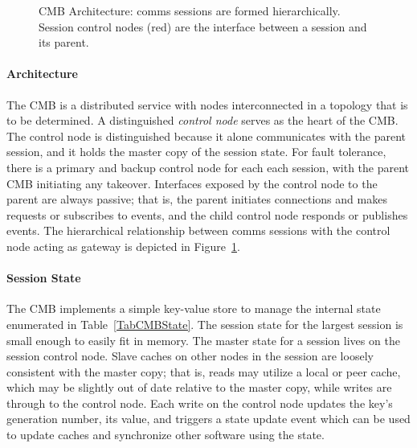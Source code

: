 \begin{figure}
\begin{minipage}[b]{0.2\linewidth}
\end{minipage}
\caption{CMB Architecture:  comms sessions are formed hierarchically.
Session control nodes (red) are the interface between a session and its parent.}
\label{FigCommsEx1}
\end{figure}

\paragraph{Architecture}
The CMB is a distributed service with nodes interconnected in a topology
that is to be determined.
A distinguished {\em control node} serves as the heart of the CMB.
The control node is distinguished because it alone communicates with
the parent session, and it holds the master copy of the session state.
For fault tolerance, there is a primary and backup control node for each
each session, with the parent CMB initiating any takeover.
Interfaces exposed by the control node to the parent are always passive;
that is, the parent initiates connections and makes requests or subscribes
to events, and the child control node responds or publishes events.
The hierarchical relationship between comms sessions with the control
node acting as gateway is depicted in Figure~\ref{FigCommsEx1}.

\paragraph{Session State}
The CMB implements a simple key-value store to manage the
internal state enumerated in Table~\ref{TabCMBState}.
The session state for the largest session is small enough to easily
fit in memory.
The master state for a session lives on the session control node.
Slave caches on other nodes in the session are loosely consistent with
the master copy; that is, reads may utilize a local or peer cache,
which may be slightly out of date relative to the master copy,
while writes are through to the control node.
Each write on the control node updates the key's generation number,
its value, and triggers a state update event which
can be used to update caches and synchronize other software using the
state.

